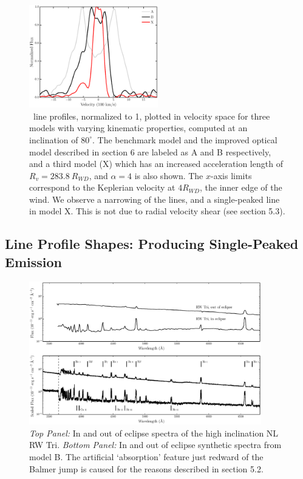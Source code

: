 \documentclass[preprint, a4paper, 11pt]{aastex}
\begin{document}
\begin{figure}
\includegraphics[width=0.5\textwidth]{figures/mc.eps}
\caption{
\ha\ line profiles, normalized to 1, plotted in velocity space 
for three models with varying kinematic 
properties, computed at an inclination of $80^\circ$.
The benchmark model and the improved optical
model described in section 6 are labeled as A and B respectively,
and a third model (X) which has an increased acceleration length of 
$R_v = 283.8~R_{WD}$, and $\alpha=4$ is also shown. 
The $x$-axis limits correspond to the Keplerian velocity at 
$4R_{WD}$, the inner edge of the wind.
We observe a narrowing of the lines, and a single-peaked line in model X.
This is not due to radial velocity shear (see section 5.3).
}
\label{halpha}
\end{figure} %




\subsection{Line Profile Shapes: Producing Single-Peaked Emission}

\begin{figure} %
\includegraphics[width=0.9\textwidth]{figures/fig13.eps}
\caption{{\sl Top Panel:} In and out of eclipse spectra of the high
inclination NL RW Tri. {\sl Bottom Panel:} In and out of eclipse synthetic
spectra from model B.
The artificial `absorption' feature just redward of the Balmer jump
is caused for the reasons described in section 5.2.}
\label{rwtricomp}
\end{figure} %
\end{document}
